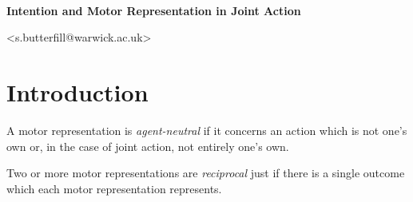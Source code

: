 \documentclass[11pt]{extarticle}
\date{}
\begin{document}
\begin{multicols}{3}

\setlength\footnotesep{1em}






\

\begin{center}
{\Large
\textbf{Intention and Motor Representation in Joint Action}
}



<s.butterfill@warwick.ac.uk>

\end{center}
%
%
%

\section{Introduction}
A motor representation is \emph{agent-neutral} if it concerns an action which is not one’s own or, in the case of joint action, not entirely one’s own.

Two or more motor representations are \emph{reciprocal} just if there is a single outcome which each motor representation represents.


\end{multicols}
\end{document}
